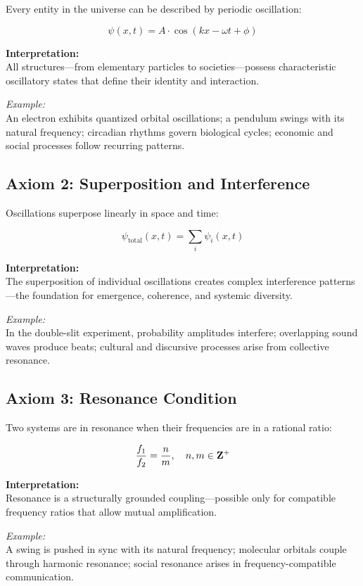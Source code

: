 \documentclass[12pt]{iopart}
\providecommand{\mathbb}[1]{\mathbf{#1}}
\providecommand{\text}[1]{\mbox{#1}}
\providecommand{\quad}{\hskip1em\relax}
\begin{document}
Every entity in the universe can be described by periodic oscillation:

$$
\psi(x, t) = A \cdot \cos(kx - \omega t + \phi)
$$

\textbf{Interpretation:}\\
All structures—from elementary particles to societies—possess characteristic oscillatory states that define their identity and interaction.

\textit{Example:}\\
An electron exhibits quantized orbital oscillations; a pendulum swings with its natural frequency; circadian rhythms govern biological cycles; economic and social processes follow recurring patterns.

\newpage

\subsection{Axiom 2: Superposition and Interference}

Oscillations superpose linearly in space and time:

$$
\psi_{\text{total}}(x, t) = \sum_i \psi_i(x, t)
$$

\textbf{Interpretation:}\\
The superposition of individual oscillations creates complex interference patterns—the foundation for emergence, coherence, and systemic diversity.

\textit{Example:}\\
In the double-slit experiment, probability amplitudes interfere; overlapping sound waves produce beats; cultural and discursive processes arise from collective resonance.

\subsection{Axiom 3: Resonance Condition}

Two systems are in resonance when their frequencies are in a rational ratio:

$$
\frac{f_1}{f_2} = \frac{n}{m},\quad n, m \in \mathbb{Z}^+
$$

\textbf{Interpretation:}\\
Resonance is a structurally grounded coupling—possible only for compatible frequency ratios that allow mutual amplification.

\textit{Example:}\\
A swing is pushed in sync with its natural frequency; molecular orbitals couple through harmonic resonance; social resonance arises in frequency-compatible communication.
\end{document}
